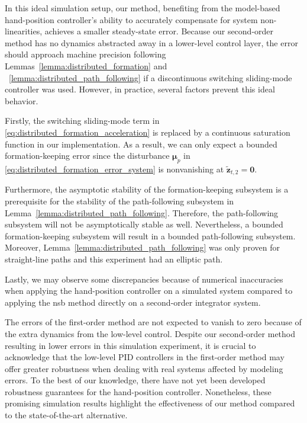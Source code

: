 In this ideal simulation setup, our method, benefiting from the model-based hand-position controller's ability to accurately compensate for system non-linearities, achieves a smaller steady-state error. Because our second-order method has no dynamics abstracted away in a lower-level control layer, the error should approach machine precision following Lemmas~\ref{lemma:distributed_formation} and ~\ref{lemma:distributed_path_following} if a discontinuous switching sliding-mode controller was used. However, in practice, several factors prevent this ideal behavior. 

Firstly, the switching sliding-mode term in \eqref{eq:distributed_formation_acceleration} is replaced by a continuous saturation function in our implementation. As a result, we can only expect a bounded formation-keeping error since the disturbance $\bm{\mu}_p$ in \eqref{eq:distributed_formation_error_system} is nonvanishing at $\tilde{\mathbf{z}}_{t,2} = \mathbf{0}$.

Furthermore, the asymptotic stability of the formation-keeping subsystem is a prerequisite for the stability of the path-following subsystem in Lemma~\ref{lemma:distributed_path_following}. Therefore, the path-following subsystem will not be asymptotically stable as well. Nevertheless, a bounded formation-keeping subsystem will result in a bounded path-following subsystem. Moreover, Lemma~\ref{lemma:distributed_path_following} was only proven for straight-line paths and this experiment had an elliptic path. 

Lastly, we may observe some discrepancies because of numerical inaccuracies when applying the hand-position controller on a simulated system compared to applying the \gls{nsb} method directly on a second-order integrator system.

The errors of the first-order method are not expected to vanish to zero because of the extra dynamics from the low-level control. Despite our second-order method resulting in lower errors in this simulation experiment, it is crucial to acknowledge that the low-level PID controllers in the first-order method may offer greater robustness when dealing with real systems affected by modeling errors. To the best of our knowledge, there have not yet been developed robustness guarantees for the hand-position controller. Nonetheless, these promising simulation results highlight the effectiveness of our method compared to the state-of-the-art alternative.



